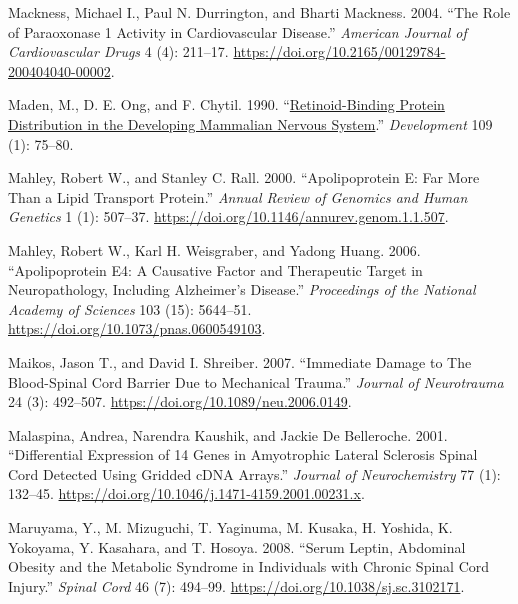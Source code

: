 \documentclass[9pt,lineno]{elife}
\newlength{\cslhangindent}
\newlength{\cslentryspacingunit} %
\newenvironment{CSLReferences}[2] %
 {%
  \setlength{\parindent}{0pt}
  \ifodd #1
  \let\oldpar\par
  \def\par{\hangindent=\cslhangindent\oldpar}
  \fi
  \setlength{\parskip}{#2\cslentryspacingunit}
 }%
 {}
\begin{document}
\begin{landscape}
\begin{landscape}
\begin{landscape}
\begin{landscape}
\begin{CSLReferences}{1}{0}
\leavevmode{}%
Mackness, Michael I., Paul N. Durrington, and Bharti Mackness. 2004. {``The {Role} of {Paraoxonase} 1 {Activity} in {Cardiovascular Disease}.''} \emph{American Journal of Cardiovascular Drugs} 4 (4): 211--17. \url{https://doi.org/10.2165/00129784-200404040-00002}.

\leavevmode{}%
Maden, M., D. E. Ong, and F. Chytil. 1990. {``\href{https://www.ncbi.nlm.nih.gov/pubmed/2170099}{Retinoid-Binding Protein Distribution in the Developing Mammalian Nervous System}.''} \emph{Development} 109 (1): 75--80.

\leavevmode{}%
Mahley, Robert W., and Stanley C. Rall. 2000. {``Apolipoprotein {E}: {Far More Than} a {Lipid Transport Protein}.''} \emph{Annual Review of Genomics and Human Genetics} 1 (1): 507--37. \url{https://doi.org/10.1146/annurev.genom.1.1.507}.

\leavevmode{}%
Mahley, Robert W., Karl H. Weisgraber, and Yadong Huang. 2006. {``Apolipoprotein {E4}: {A} Causative Factor and Therapeutic Target in Neuropathology, Including {Alzheimer}'s Disease.''} \emph{Proceedings of the National Academy of Sciences} 103 (15): 5644--51. \url{https://doi.org/10.1073/pnas.0600549103}.

\leavevmode{}%
Maikos, Jason T., and David I. Shreiber. 2007. {``Immediate {Damage} to {The Blood-Spinal Cord Barrier Due} to {Mechanical Trauma}.''} \emph{Journal of Neurotrauma} 24 (3): 492--507. \url{https://doi.org/10.1089/neu.2006.0149}.

\leavevmode{}%
Malaspina, Andrea, Narendra Kaushik, and Jackie De Belleroche. 2001. {``Differential Expression of 14 Genes in Amyotrophic Lateral Sclerosis Spinal Cord Detected Using Gridded {cDNA} Arrays.''} \emph{Journal of Neurochemistry} 77 (1): 132--45. \url{https://doi.org/10.1046/j.1471-4159.2001.00231.x}.

\leavevmode{}%
Maruyama, Y., M. Mizuguchi, T. Yaginuma, M. Kusaka, H. Yoshida, K. Yokoyama, Y. Kasahara, and T. Hosoya. 2008. {``Serum Leptin, Abdominal Obesity and the Metabolic Syndrome in Individuals with Chronic Spinal Cord Injury.''} \emph{Spinal Cord} 46 (7): 494--99. \url{https://doi.org/10.1038/sj.sc.3102171}.


\end{CSLReferences}
\end{landscape}
\end{landscape}
\end{landscape}
\end{landscape}
\end{document}
